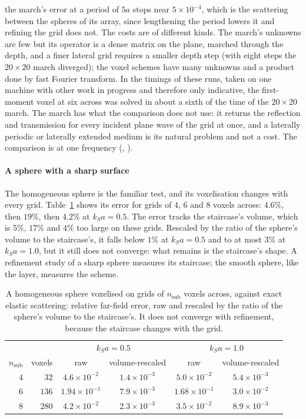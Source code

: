 \documentclass[preprint,review,12pt]{elsarticle}
\begin{document}
the march's error at a period of $5a$ stops near $5\times10^{-4}$, which is the scattering between the
spheres of its array, since lengthening the period lowers it and refining the grid does not. The costs
are of different kinds. The march's unknowns are few but its operator is a dense matrix on the plane,
marched through the depth, and a finer lateral grid requires a smaller depth step (with eight steps the
$20\times20$ march diverged); the voxel schemes have many unknowns and a product done by fast Fourier
transform. In the timings of these runs, taken on one machine with other work in progress and
therefore only indicative, the first-moment voxel at six across was solved in about a sixth of the time of
the $20\times20$ march. The march has what the comparison does not use: it returns the reflection and
transmission for every incident plane wave of the grid at once, and a laterally periodic or laterally
extended medium is its natural problem and not a cost. The comparison is at one frequency
(, ).

\paragraph{A sphere with a sharp surface} The homogeneous sphere is the familiar test, and its
voxelisation changes with every grid. Table~\ref{tab:sphereraw} shows its error for grids of $4$, $6$
and $8$ voxels across: $4.6\%$, then $19\%$, then $4.2\%$ at $k_Sa=0.5$. The error tracks the
staircase's volume, which is $5\%$, $17\%$ and $4\%$ too large on these grids. Rescaled by the ratio of
the sphere's volume to the staircase's, it falls below $1\%$ at $k_Sa=0.5$ and to at most
$3\%$ at $k_Sa=1.0$, but it still does not converge: what remains is the staircase's shape. A refinement
study of a sharp sphere measures its staircase; the smooth sphere, like the layer, measures the scheme.

\begin{table}[htbp]
\centering
\caption{A homogeneous sphere voxelised on grids of $n_{\mathrm{sub}}$ voxels across, against exact
elastic scattering: relative far-field error, raw and rescaled by the ratio of the sphere's volume to the
staircase's. It does not converge with refinement, because the staircase changes with the grid.}
\label{tab:sphereraw}
\small
\begin{tabular}{@{}rrcccc@{}}
\toprule
 & & \multicolumn{2}{c}{$k_Sa=0.5$} & \multicolumn{2}{c}{$k_Sa=1.0$} \\
$n_{\mathrm{sub}}$ & voxels & raw & volume-rescaled & raw & volume-rescaled \\
\midrule
$4$ & $32$  & $4.6\times10^{-2}$ & $1.4\times10^{-3}$ & $5.0\times10^{-2}$ & $5.4\times10^{-3}$ \\
$6$ & $136$ & $1.94\times10^{-1}$ & $7.9\times10^{-3}$ & $1.68\times10^{-1}$ & $3.0\times10^{-2}$ \\
$8$ & $280$ & $4.2\times10^{-2}$ & $2.3\times10^{-3}$ & $3.5\times10^{-2}$ & $8.9\times10^{-3}$ \\
\bottomrule
\end{tabular}
\end{table}
\end{document}
